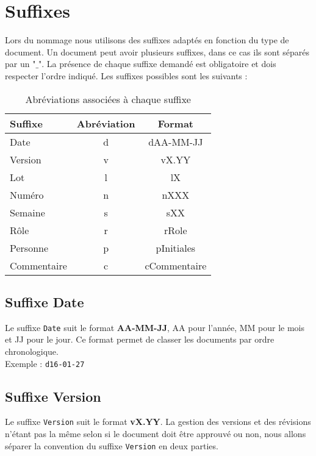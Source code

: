 \section{Suffixes}

Lors du nommage nous utilisons des suffixes adaptés en fonction du type de document. Un document peut avoir plusieurs suffixes, dans ce cas ils sont séparés par un "$\_$". La présence de chaque suffixe demandé est obligatoire et dois respecter l'ordre indiqué. Les suffixes possibles sont les suivants : 

	\begin{table}[H]
		\centering
		\begin{tabularx}{10cm}{|X|c|c|}
		\hline
		\rowcolor[gray]{0.85} Suffixe & Abréviation & Format\\
		\hline
		Date & d & dAA-MM-JJ\\
		\hline
		Version & v & vX.YY\\
		\hline
		Lot & l & lX\\		
		\hline
		Numéro & n & nXXX\\
		\hline
		Semaine & s & sXX\\
		\hline
		Rôle & r & rRole\\
		\hline
		Personne & p & pInitiales\\
		\hline
		Commentaire & c & cCommentaire\\
		\hline
		\end{tabularx}
	\caption{Abréviations associées à chaque suffixe}
	\label{Suffixes}
	\end{table}
	


\subsection{Suffixe Date}
\label{suffixe_date}

Le suffixe \verb+Date+ suit le format \textbf{AA-MM-JJ}, AA pour l'année, MM pour le mois et JJ pour le jour. Ce format permet de classer les documents par ordre chronologique.\\

Exemple : \verb+d16-01-27+

\subsection{Suffixe Version}
\label{suffixe_version}

Le suffixe \verb+Version+ suit le format \textbf{vX.YY}. La gestion des versions et des révisions n'étant pas la même selon si le document doit être approuvé ou non, nous allons séparer la convention du suffixe \verb+Version+ en deux parties. \\

